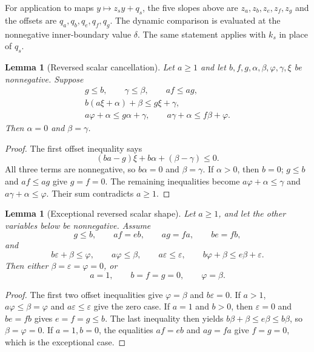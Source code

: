 \documentclass[11pt,a4paper]{article}
\newtheorem{lemma}[theorem]{Lemma}
\begin{document}
For application to maps \(y\mapsto z_sy+q_s\), the five slopes above are
\(z_a,z_b,z_e,z_f,z_g\) and the offsets are
\(q_a,q_b,q_e,q_f,q_g\). The dynamic comparison is evaluated at the
nonnegative inner-boundary value \(\delta\). The same statement applies
with \(k_s\) in place of \(q_s\).

\begin{lemma}[Reversed scalar cancellation]\label{lem:scalar-reversed}
Let \(a\ge1\) and let \(b,f,g,\alpha,\beta,\varphi,\gamma,\xi\)
be nonnegative. Suppose
\begin{gather*}
g\le b,\qquad \gamma\le\beta,\qquad af\le ag,\\
b(a\xi+\alpha)+\beta\le g\xi+\gamma,\\
a\varphi+\alpha\le g\alpha+\gamma,\qquad
a\gamma+\alpha\le f\beta+\varphi.
\end{gather*}
Then \(\alpha=0\) and \(\beta=\gamma\).
\end{lemma}
\begin{proof}
The first offset inequality says
\[
(ba-g)\xi+b\alpha+(\beta-\gamma)\le0.
\]
All three terms are nonnegative, so \(b\alpha=0\) and
\(\beta=\gamma\). If \(\alpha>0\), then \(b=0\);
\(g\le b\) and \(af\le ag\) give \(g=f=0\).
The remaining inequalities become
\(a\varphi+\alpha\le\gamma\) and
\(a\gamma+\alpha\le\varphi\). Their sum contradicts \(a\ge1\).
\end{proof}

\begin{lemma}[Exceptional reversed scalar shape]\label{lem:scalar-reversed-shape}
Let \(a\ge1\), and let the other variables below be nonnegative.
Assume
\[
g\le b,\qquad af=eb,\qquad ag=fa,\qquad be=fb,
\]
and
\[
b\varepsilon+\beta\le\varphi,\qquad
a\varphi\le\beta,\qquad
a\varepsilon\le\varepsilon,\qquad
b\varphi+\beta\le e\beta+\varepsilon.
\]
Then either \(\beta=\varepsilon=\varphi=0\), or
\[
a=1,\qquad b=f=g=0,\qquad\varphi=\beta.
\]
\end{lemma}
\begin{proof}
The first two offset inequalities give
\(\varphi=\beta\) and \(b\varepsilon=0\).
If \(a>1\), \(a\varphi\le\beta=\varphi\) and
\(a\varepsilon\le\varepsilon\) give the zero case.
If \(a=1\) and \(b>0\), then \(\varepsilon=0\) and
\(be=fb\) gives \(e=f=g\le b\). The last inequality then yields
\(b\beta+\beta\le e\beta\le b\beta\), so \(\beta=\varphi=0\).
If \(a=1,b=0\), the equalities \(af=eb\) and \(ag=fa\)
give \(f=g=0\), which is the exceptional case.
\end{proof}
\end{document}
